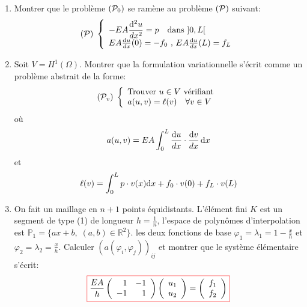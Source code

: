 \documentclass{article}
\def \de {{\rm d}}
\newcommand{\myredbox}[1]{\fcolorbox{red}{white}{$\displaystyle#1$}}
\begin{document}
\begin{enumerate}
\item Montrer que le problème $({\cal P}_0)$ se ramène au problème  $({\cal P})$ suivant:
\[
({\cal P})\;\left\{
\begin{array}{l}
-\displaystyle EA\frac{\de^2 u}{dx^2}=p\quad \mbox{dans } ]0,L[\\
 EA\frac{\de u}{dx}(0)=-f_0 \mbox{ , } EA\frac{\de u}{dx}(L)=f_L
\end{array}
\right.
\]
\item Soit $V=H^1(\Omega)$. Montrer que la formulation variationnelle s'écrit comme un problème abstrait de la forme:
\[
({\cal P}_v)\;\left\{
\begin{array}{l}
\mbox{Trouver } u\in V \mbox{ vérifiant}\\
a(u,v)=\ell(v)\quad \forall v\in V
\end{array}
\right.
\]
où \[ a(u,v)=\displaystyle EA\int_0^L\frac{\de u}{dx}\cdot \frac{\de v}{dx}\,\de x\]
et \[ \ell(v)=\displaystyle \int_0^L p\cdot v(x)\de x+f_0 \cdot v(0)+f_L \cdot v(L)\]
\item On fait un maillage en $n+1$ points équidistants. L'élément fini $K$ est un segment de type (1) de longueur $h=\frac 1n$, l'espace de polynômes d'interpolation est $\mathbb{P}_1=\{ax+b,\;(a,b)\in \mathbb{R}^2\}$. les deux fonctions de base $\varphi_1=\lambda_1=1-\frac{x}{h}$ et $\varphi_2=\lambda_2=\frac{x}{h}$.  Calculer $(a(\varphi_i,\varphi_j))_{ij}$ et montrer que le système élémentaire s'écrit:
\[\myredbox{\frac{EA}{h}\left(\begin{array}{rr} 
1&-1\\-1&1
\end{array}\right) \left(\begin{array}{l} 
u_{1}\\u_{2}
\end{array}\right)=\left(\begin{array}{r} 
f_{1}\\f_{2}
\end{array}\right)}
\]
\end{enumerate}
\end{document}
